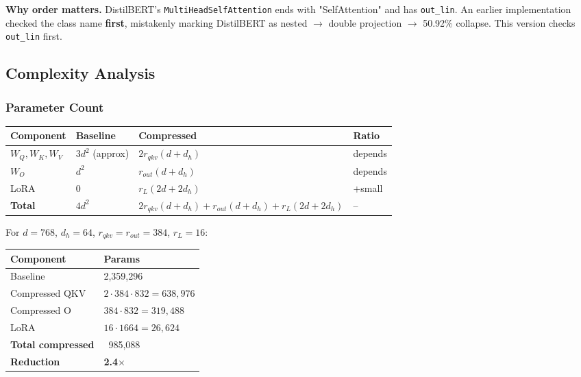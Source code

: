 \textbf{Why order matters.} DistilBERT's \texttt{MultiHeadSelfAttention} ends with 
"SelfAttention" and has \texttt{out\_lin}. An earlier implementation checked the 
class name \textbf{first}, mistakenly marking DistilBERT as nested $\to$ double 
projection $\to$ 50.92\% collapse. This version checks \texttt{out\_lin} first.

\subsection{Complexity Analysis}

\subsubsection{Parameter Count}

\begin{table}[H]
\centering
\small
\begin{tabular}{llll}
\toprule
\textbf{Component} & \textbf{Baseline} & \textbf{Compressed} & \textbf{Ratio} \\
\midrule
$W_Q, W_K, W_V$ & $3 d^2$ (approx) & $2 r_{qkv} (d + d_h)$ & depends \\
$W_O$ & $d^2$ & $r_{out} (d + d_h)$ & depends \\
LoRA & 0 & $r_L (2d + 2 d_h)$ & +small \\
\textbf{Total} & $4 d^2$ & $2 r_{qkv} (d+d_h) + r_{out}(d+d_h) + r_L(2d + 2d_h)$ & -- \\
\bottomrule
\end{tabular}
\end{table}

For $d = 768$, $d_h = 64$, $r_{qkv} = r_{out} = 384$, $r_L = 16$:

\begin{table}[H]
\centering
\small
\begin{tabular}{ll}
\toprule
\textbf{Component} & \textbf{Params} \\
\midrule
Baseline & 2,359,296 \\
Compressed QKV & $2 \cdot 384 \cdot 832 = 638,976$ \\
Compressed O & $384 \cdot 832 = 319,488$ \\
LoRA & $16 \cdot 1664 = 26,624$ \\
\textbf{Total compressed} & ~985,088 \\
\textbf{Reduction} & \textbf{2.4$\times$} \\
\bottomrule
\end{tabular}
\end{table}

